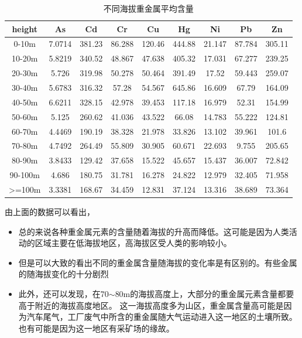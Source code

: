 \documentclass[a4paper]{article}
\begin{document}
\begin{table}[H]
		\centering
		\caption{不同海拔重金属平均含量}
		\label{average-contend}
		\begin{tabular}{c|cccccccc}
		\hline
			height	  &          	As	&   Cd   &     Cr     &   Cu   &     Hg  &    Ni   &     Pb    &   Zn  \\
			\hline
			 0-10m     	&	 7.0714  &  381.23  &  86.288  &  120.46 &   444.88 &   21.147 &   87.784  &  305.11     \\
    			10-20m     	&	 5.8219  &  340.52  &  48.867  &  47.638 &   405.32 &   17.031 &   67.277  &   239.25    \\
   			20-30m    	&	 5.726   &  319.98  &  50.278  &  50.464 &   391.49 &    17.52 &   59.443  &  259.07     \\
    			30-40m     	&	 5.6783  &  316.32  &   57.28  &  54.567 &   645.86 &   16.609 &    67.79  &  164.09     \\
    			40-50m     	&	 6.6211  &  328.15  &  42.978  &  39.453 &   117.18 &   16.979 &    52.31  &  154.99     \\
    			50-60m      	&	 5.125   & 260.62   & 41.036   & 43.522  &   66.08  &  14.783  &  55.222   & 124.81      \\
    			60-70m     	&	 4.4469  &  190.19  &  38.328  &  21.978 &   33.826 &   13.102 &   39.961  &   101.6     \\
    			70-80m     	&	 4.7492  &  264.49  &  55.809  &  30.905 &   60.671 &   22.693 &   9.755  &  205.65     \\
    			80-90m     	&	 3.8433  &  129.42  &  37.658  &  15.522 &   45.657 &   15.437 &   36.007  &  72.842     \\
    			90-100m    	&	 4.686   & 180.75   & 31.781   & 16.278  &  24.822  &  12.979  &  32.405   & 71.958      \\
    			>=100m    	&	 3.3381  &  168.67  &  34.459  &  12.831 &   37.124 &   13.316 &   38.689  &  73.364     \\
    			\hline
		\end{tabular}
	\end{table}
由上面的数据可以看出，
\begin{itemize}
\item 总的来说各种重金属元素的含量随着海拔的升高而降低。这可能是因为人类活动的区域主要在低海拔地区，高海拔区受人类的影响较小。
\item 但是可以大致的看出不同的重金属含量随海拔的变化率是有区别的。有些金属的随海拔变化的十分剧烈
\item 此外，还可以发现，在70$\sim$80m的海拔高度上，大部分的重金属元素含量都要高于附近的海拔高度地区。
这一海拔高度多为山区，重金属含量高可能是因为汽车尾气，工厂废气中所含的重金属随大气运动进入这一地区的土壤所致。
也有可能是因为这一地区有采矿场的缘故。

\end{itemize}
\end{document}
